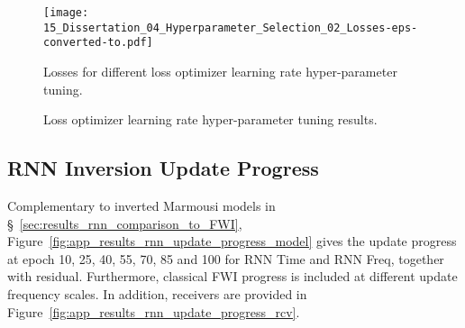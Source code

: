 \begin{figure}[!ht]
        \centering
        \texttt{[image: 15\_Dissertation\_04\_Hyperparameter\_Selection\_02\_Losses-eps-converted-to.pdf]}
        \caption[Losses for different loss optimizer learning rate hyper-parameter tuning.]{Losses for different loss optimizer learning rate hyper-parameter tuning.}
	\label{fig:app_results_rnn_hp_tuning_losses}
\end{figure}

\begin{figure}[!ht]
	\centering
	\caption[Different Loss optimizer learning rate hyper-parameter tuning results.]{Loss optimizer learning rate hyper-parameter tuning results.}
	\label{fig:app_results_rnn_hp_tuning_inversion}
\end{figure}

\clearpage


\subsection{RNN Inversion Update Progress}\label{sec:app_results_rnn_update_progress}
Complementary to inverted Marmousi models in §~\ref{sec:results_rnn_comparison_to_FWI}, Figure~\ref{fig:app_results_rnn_update_progress_model} gives the update progress at epoch 10, 25, 40, 55, 70, 85 and 100 for RNN Time and RNN Freq, together with residual. Furthermore, classical FWI progress is included at different update frequency scales. In addition, receivers are provided in Figure~\ref{fig:app_results_rnn_update_progress_rcv}.

